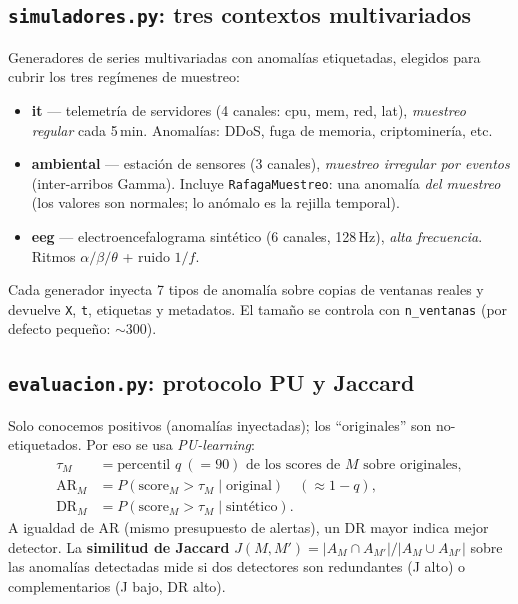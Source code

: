 \documentclass[11pt,a4paper]{article}
\begin{document}
\subsection{\texttt{simuladores.py}: tres contextos multivariados}

Generadores de series multivariadas con anomalías etiquetadas, elegidos para
cubrir los tres regímenes de muestreo:

\begin{itemize}[leftmargin=1.6em]
\item \textbf{it} --- telemetría de servidores (4 canales: cpu, mem, red, lat),
  \emph{muestreo regular} cada 5\,min. Anomalías: DDoS, fuga de memoria,
  criptominería, etc.
\item \textbf{ambiental} --- estación de sensores (3 canales),
  \emph{muestreo irregular por eventos} (inter-arribos Gamma). Incluye
  \texttt{RafagaMuestreo}: una anomalía \emph{del muestreo} (los valores son
  normales; lo anómalo es la rejilla temporal).
\item \textbf{eeg} --- electroencefalograma sintético (6 canales, 128\,Hz),
  \emph{alta frecuencia}. Ritmos $\alpha/\beta/\theta$ + ruido $1/f$.
\end{itemize}

\noindent Cada generador inyecta 7 tipos de anomalía sobre copias de ventanas
reales y devuelve \texttt{X}, \texttt{t}, etiquetas y metadatos. El tamaño se
controla con \texttt{n\_ventanas} (por defecto pequeño: $\sim$300).

\subsection{\texttt{evaluacion.py}: protocolo PU y Jaccard}

Solo conocemos positivos (anomalías inyectadas); los ``originales'' son
no-etiquetados. Por eso se usa \emph{PU-learning}:
\begin{align*}
\tau_M &= \text{percentil } q\ (=90) \text{ de los scores de } M \text{ sobre originales},\\
\mathrm{AR}_M &= P(\text{score}_M>\tau_M \mid \text{original})\quad(\approx 1-q),\\
\mathrm{DR}_M &= P(\text{score}_M>\tau_M \mid \text{sintético}).
\end{align*}
A igualdad de AR (mismo presupuesto de alertas), un DR mayor indica mejor
detector. La \textbf{similitud de Jaccard}
$J(M,M')=|A_M\cap A_{M'}|/|A_M\cup A_{M'}|$ sobre las anomalías detectadas mide
si dos detectores son redundantes (J alto) o complementarios (J bajo, DR alto).
\end{document}
